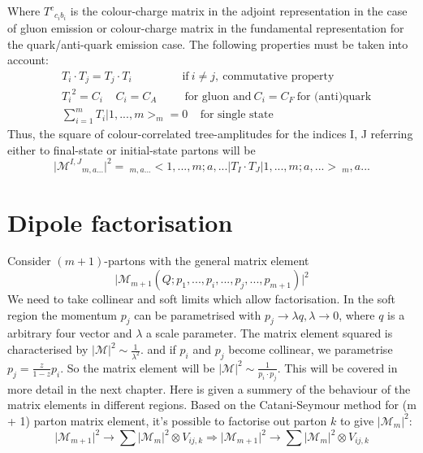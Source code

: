 Where $ {T^c}_{c_ib_i} $ is the colour-charge matrix in the adjoint representation in the case of gluon emission or colour-charge matrix in the fundamental representation for the quark/anti-quark emission case. The following properties must be taken into account:
\begin{equation}
\begin{split}
&T_i \cdot T_j = T_j \cdot T_i \:\:\:\:\:\:\:\:\:\:\:\:\:\:\:\:\:\:\:\:\text{if}\:i\neq j,\: \text{commutative property}\\
& {T_i}^2 = C_i\:\:\:\:\:C_i = C_A \:\:\:\:\:\:\:\:\:\:\:\text{for gluon and} \: C_i = C_F\:\text{for (anti)quark}\\
&\sum_{i=1}^m T_i |1,...,m>_m =0 \:\:\:\:\:\text{for single state}
\end{split}
\end{equation}
Thus, the square of colour-correlated tree-amplitudes for the indices I, J referring either to final-state or initial-state partons will be~\cite{Catani:1996vz, Catani:2002hc}
\begin{equation}
\vert {{\mathcal{M}}^{I,J}}_{m,a...} \vert^2=\:_{m,a...} < 1,...,m;a,... |T_I \cdot T_J | 1,...,m;a,... >\:_m,a...
\end{equation}



\section*{Dipole factorisation}
Consider $(m+1)$-partons with the general matrix element~\cite{Seymour:1994we, Catani:2002hc}
\begin{equation}
\vert {{\mathcal{M}}}_{m+1} (Q; p_1,...,p_i,...,p_j,...,p_{m+1}) \vert^2
\end{equation}
We need to take collinear and soft limits which allow factorisation.
In the soft region the momentum $ p_j $ can be parametrised with $ p_j \rightarrow \lambda q, \lambda \rightarrow 0 $, where $ q $ is a arbitrary four vector and $ \lambda $ a scale parameter. 
The matrix element squared is characterised by $ \vert {{\mathcal{M}}} \vert^2 \sim \frac{1}{\lambda^2}$. and if $ p_i $ and $ p_j $ become collinear, we parametrise $ p_j = \frac{z}{1-z} p_i $. So the matrix element will be $ \vert {{\mathcal{M}}} \vert^2 \sim \frac{1}{p_i \cdot p_j}$.
This will be covered in more detail in the next chapter. Here is given a summery of the behaviour of the matrix elements in different regions.
Based on the Catani-Seymour method for (m + 1) parton matrix element, it's possible to factorise out parton $k$ to give $ \vert {{\mathcal{M}}}_{m}  \vert^2 $:
\begin{equation}
\vert {{\mathcal{M}}}_{m+1}  \vert^2 \rightarrow \sum \vert {{\mathcal{M}}}_{m}  \vert^2 \otimes V_{ij,k}
\Rightarrow \vert {{\mathcal{M}}}_{m+1}  \vert^2 \rightarrow \sum \vert {{\mathcal{M}}}_{m}  \vert^2 \otimes V_{ij,k}
\end{equation}

